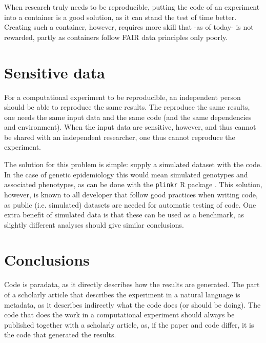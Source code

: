 
When research truly needs to be reproducible, putting the code 
of an experiment into a container is a good solution, as it 
can stand the test of time better.
Creating such a container, however, requires more skill
that -as of today- is not rewarded,
partly as containers follow FAIR data principles only poorly.

\section{Sensitive data}

For a computational experiment to be reproducible,
an independent person should be able to
reproduce the same results.
The reproduce the same results, one needs the same
input data and the same code (and the same 
dependencies and environment).
When the input data are sensitive, however, and thus cannot be shared with
an independent researcher, one thus cannot reproduce the
experiment.

The solution for this problem is simple:
supply a simulated dataset with the code.
In the case of genetic epidemiology this would mean
simulated genotypes and associated phenotypes,
as can be done with the \verb|plinkr| R package \cite{plinkr}.
This solution, however, is known to all developer that follow
good practices when writing code, as public (i.e. simulated) 
datasets are needed for automatic testing of code.
One extra benefit of simulated data is that these can be used
as a benchmark, as slightly different analyses should give 
similar conclusions.

\section{Conclusions}

Code is paradata, as it directly describes how the results are generated.
The part of a scholarly article 
that describes the experiment in a natural language is metadata, 
as it describes indirectly what the code does (or should be doing).
The code that does the work in a computational experiment should
always be published together with a scholarly article,
as, if the paper and code differ, it is the code that generated the results.

